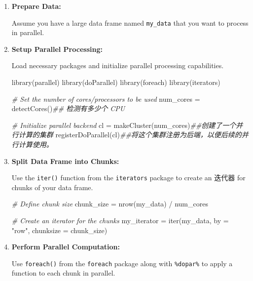 \documentclass[
]{article}
\newenvironment{Shaded}{}{}
\newcommand{\AttributeTok}[1]{\textcolor[rgb]{0.49,0.56,0.16}{#1}}
\newcommand{\CommentTok}[1]{\textcolor[rgb]{0.38,0.63,0.69}{\textit{#1}}}
\newcommand{\DocumentationTok}[1]{\textcolor[rgb]{0.73,0.13,0.13}{\textit{#1}}}
\newcommand{\FunctionTok}[1]{\textcolor[rgb]{0.02,0.16,0.49}{#1}}
\newcommand{\NormalTok}[1]{#1}
\newcommand{\OtherTok}[1]{\textcolor[rgb]{0.00,0.44,0.13}{#1}}
\newcommand{\SpecialCharTok}[1]{\textcolor[rgb]{0.25,0.44,0.63}{#1}}
\newcommand{\StringTok}[1]{\textcolor[rgb]{0.25,0.44,0.63}{#1}}
\begin{document}
\begin{enumerate}
\def\labelenumi{\arabic{enumi}.}
\item
  \textbf{Prepare Data:}

  Assume you have a large data frame named \texttt{my\_data} that you
  want to process in parallel.
\item
  \textbf{Setup Parallel Processing:}

  Load necessary packages and initialize parallel processing
  capabilities.

\begin{Shaded}
\begin{Highlighting}[]
 \FunctionTok{library}\NormalTok{(parallel)}
 \FunctionTok{library}\NormalTok{(doParallel)}
 \FunctionTok{library}\NormalTok{(foreach)}
 \FunctionTok{library}\NormalTok{(iterators)}


 \CommentTok{\# Set the number of cores/processors to be used}
\NormalTok{ num\_cores }\OtherTok{=} \FunctionTok{detectCores}\NormalTok{()}\DocumentationTok{\#\# 检测有多少个 CPU }

 \CommentTok{\# Initialize parallel backend}
\NormalTok{ cl }\OtherTok{=} \FunctionTok{makeCluster}\NormalTok{(num\_cores)}\DocumentationTok{\#\#创建了一个并行计算的集群}
 \FunctionTok{registerDoParallel}\NormalTok{(cl)}\DocumentationTok{\#\#将这个集群注册为后端，以便后续的并行计算使用。}
\end{Highlighting}
\end{Shaded}
\item
  \textbf{Split Data Frame into Chunks:}

  Use the \texttt{iter()} function from the \texttt{iterators} package
  to create an 迭代器 for chunks of your data frame.

\begin{Shaded}
\begin{Highlighting}[]
 \CommentTok{\# Define chunk size}
\NormalTok{ chunk\_size }\OtherTok{=} \FunctionTok{nrow}\NormalTok{(my\_data) }\SpecialCharTok{/}\NormalTok{ num\_cores}

 \CommentTok{\# Create an iterator for the chunks}
\NormalTok{ my\_iterator }\OtherTok{=} \FunctionTok{iter}\NormalTok{(my\_data, }\AttributeTok{by =} \StringTok{"row"}\NormalTok{, }\AttributeTok{chunksize =}\NormalTok{ chunk\_size)}
\end{Highlighting}
\end{Shaded}
\item
  \textbf{Perform Parallel Computation:}

  Use \texttt{foreach()} from the \texttt{foreach} package along with
  \texttt{\%dopar\%} to apply a function to each chunk in parallel.


\end{enumerate}
\end{document}
